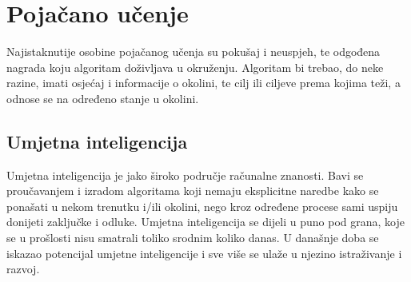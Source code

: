 \section{Pojačano učenje}
Najistaknutije osobine pojačanog učenja su pokušaj i neuspjeh, te odgođena nagrada koju algoritam doživljava u okruženju. Algoritam bi trebao, do neke razine, imati osjećaj i informacije o okolini, te cilj ili ciljeve prema kojima teži, a odnose se na određeno stanje u okolini.

\subsection{Umjetna inteligencija}
Umjetna inteligencija je jako široko područje računalne znanosti. Bavi se proučavanjem i izradom algoritama koji nemaju eksplicitne naredbe kako se ponašati u nekom trenutku i/ili okolini, nego kroz određene procese sami uspiju donijeti zaključke i odluke. Umjetna inteligencija se dijeli u puno pod grana, koje se u prošlosti nisu smatrali toliko srodnim koliko danas. U današnje doba se iskazao potencijal umjetne inteligencije i sve više se ulaže u njezino istraživanje i razvoj. 

